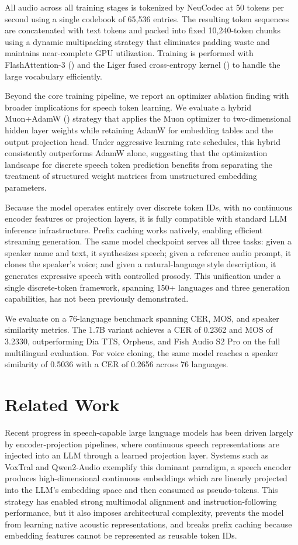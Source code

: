 \documentclass{article}
\begin{document}
All audio across all training stages is tokenized by NeuCodec at 50 tokens per second using a single codebook of 65,536 entries. The resulting token sequences are concatenated with text tokens and packed into fixed 10,240-token chunks using a dynamic multipacking strategy that eliminates padding waste and maintains near-complete GPU utilization. Training is performed with FlashAttention-3 (\citet{shah2024flashattention3fastaccurateattention}) and the Liger fused cross-entropy kernel (\citet{hsu2025ligerkernelefficienttriton}) to handle the large vocabulary efficiently.
 
Beyond the core training pipeline, we report an optimizer ablation finding with broader implications for speech token learning. We evaluate a hybrid Muon+AdamW (\citet{muon}) strategy that applies the Muon optimizer to two-dimensional hidden layer weights while retaining AdamW for embedding tables and the output projection head. Under aggressive learning rate schedules, this hybrid consistently outperforms AdamW alone, suggesting that the optimization landscape for discrete speech token prediction benefits from separating the treatment of structured weight matrices from unstructured embedding parameters.
 
Because the model operates entirely over discrete token IDs, with no continuous encoder features or projection layers, it is fully compatible with standard LLM inference infrastructure. Prefix caching works natively, enabling efficient streaming generation. The same model checkpoint serves all three tasks: given a speaker name and text, it synthesizes speech; given a reference audio prompt, it clones the speaker's voice; and given a natural-language style description, it generates expressive speech with controlled prosody. This unification under a single discrete-token framework, spanning 150+ languages and three generation capabilities, has not been previously demonstrated.
 
We evaluate on a 76-language benchmark spanning CER, MOS, and speaker similarity metrics. The 1.7B variant achieves a CER of 0.2362 and MOS of 3.2330, outperforming Dia TTS, Orpheus, and Fish Audio S2 Pro on the full multilingual evaluation. For voice cloning, the same model reaches a speaker similarity of 0.5036 with a CER of 0.2656 across 76 languages.
\section{Related Work}

Recent progress in speech-capable large language models has been driven largely by encoder-projection pipelines, where continuous speech representations are injected into an LLM through a learned projection layer. Systems such as VoxTral and Qwen2-Audio exemplify this dominant paradigm, a speech encoder produces high-dimensional continuous embeddings which are linearly projected into the LLM's embedding space and then consumed as pseudo-tokens. This strategy has enabled strong multimodal alignment and instruction-following performance, but it also imposes architectural complexity, prevents the model from learning native acoustic representations, and breaks prefix caching because embedding features cannot be represented as reusable token IDs.
\end{document}
